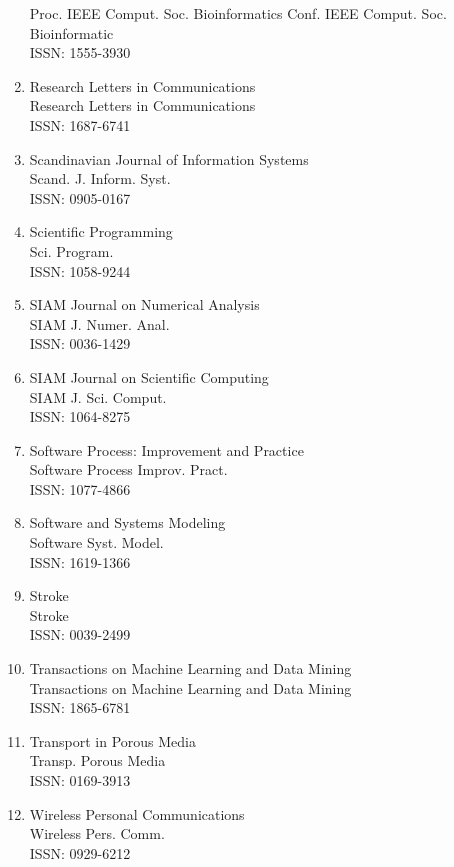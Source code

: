 \begin{enumerate}
 Proc. IEEE Comput. Soc. Bioinformatics Conf. IEEE Comput. Soc. Bioinformatic\\
 ISSN: 1555-3930
\item
 Research Letters in Communications\\
 Research Letters in Communications\\
 ISSN: 1687-6741
\item
 Scandinavian Journal of Information Systems\\
 Scand. J. Inform. Syst.\\
 ISSN: 0905-0167
\item
 Scientific Programming\\
 Sci. Program.\\
 ISSN: 1058-9244
\item
 SIAM Journal on Numerical Analysis\\
 SIAM J. Numer. Anal.\\
 ISSN: 0036-1429
\item
 SIAM Journal on Scientific Computing\\
 SIAM J. Sci. Comput.\\
 ISSN: 1064-8275
\item
 Software Process: Improvement and Practice\\
 Software Process Improv. Pract.\\
 ISSN: 1077-4866
\item
 Software and Systems Modeling\\
 Software Syst. Model.\\
 ISSN: 1619-1366
\item
 Stroke\\
 Stroke\\
 ISSN: 0039-2499
\item
 Transactions on Machine Learning and Data Mining\\
 Transactions on Machine Learning and Data Mining\\
 ISSN: 1865-6781
\item
 Transport in Porous Media\\
 Transp. Porous Media\\
 ISSN: 0169-3913
\item
 Wireless Personal Communications\\
 Wireless Pers. Comm.\\
 ISSN: 0929-6212
\end{enumerate}